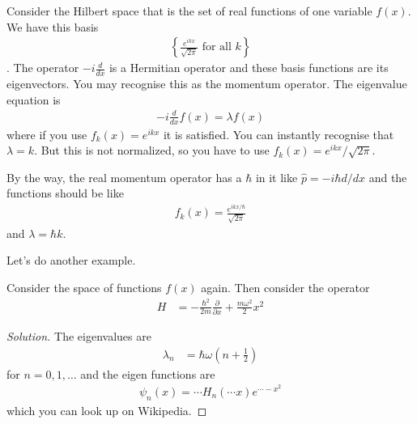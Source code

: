 \begin{example}
    Consider the Hilbert space that is the set of real functions of one variable
    $f(x)$.
    We have this basis
    \begin{align}
        \left\{\frac{e^{ikx}}{\sqrt{2\pi}}\text{ for all }k\right\}
    \end{align}.
    The operator $-i\frac{d}{dx}$ is a Hermitian operator and these basis
    functions are its eigenvectors.
    You may recognise this as the momentum operator.
    The eigenvalue equation is
    \begin{align}
        -i \frac{d}{dx} f(x) = \lambda f(x)
    \end{align}
    where if you use
    $f_k(x) = e^{ikx}$
    it is satisfied.
    You can instantly recognise that $\lambda = k$.
    But this is not normalized,
    so you have to use
    $f_k(x) = e^{ikx}/\sqrt{2\pi}$.
\end{example}
By the way, the real momentum operator has a $\hbar$ in it like
$\hat{p} = -i\hbar d/dx$
and the functions should be like
\begin{align}
    f_k(x) =
    \frac{e^{ikx/\hbar}}{\sqrt{2\pi}}
\end{align}
and $\lambda = \hbar k$.

Let's do another example.
\begin{example}
    Consider the space of functions $f(x)$ again.
    Then consider the operator
    \begin{align}
        H &=
        - \frac{\hbar^2}{2m} \frac{\partial}{\partial x}
        + \frac{m\omega^2}{2}x^2
    \end{align}
\end{example}
\begin{proof}[Solution]
    The eigenvalues are
    \begin{align}
        \lambda_n &=
        \hbar\omega\left( n + \frac{1}{2} \right)
    \end{align}
    for $n=0,1,\ldots$ and the eigen functions are
    \begin{align}
        \psi_n(x) = \cdots H_n(\cdots x) e^{\cdots -x^2}
    \end{align}
    which you can look up on Wikipedia.
\end{proof}
